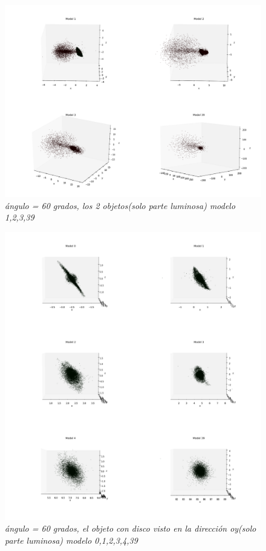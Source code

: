 \documentclass[12pt]{article} %
\renewcommand{\=}[1]{\stackrel{#1}{=}} %
\theoremstyle{definition}
\theoremstyle{remark}
\begin{document}
\begin{figure}[!ht]
 \centering
 \includegraphics[scale=0.2]{60deg-m.png}
 \caption{\emph{ ángulo = 60 grados, los 2 objetos(solo parte luminosa) modelo 1,2,3,39 }}
\end{figure}

\begin{figure}[!ht]
 \centering
 \includegraphics[scale=0.2]{60deg-m-c2y.png}
 \caption{\emph{ ángulo = 60 grados, el objeto con disco visto en la dirección oy(solo parte luminosa) modelo 0,1,2,3,4,39 }}
\end{figure}
\end{document}
